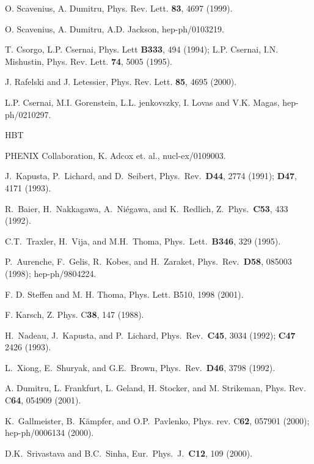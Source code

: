 \begin{thebibliography}{00}
 O. Scavenius, A. Dumitru,
         Phys. Rev. Lett. {\bf 83}, 4697 (1999).
         
 O. Scavenius, A. Dumitru, A.D. Jackson, 
          hep-ph/0103219.
          
 T. Csorgo, L.P. Csernai, Phys. Lett {\bf B333}, 494 (1994);
       L.P. Csernai, I.N. Mishustin, Phys. Rev. Lett. {\bf 74}, 5005 (1995).
       
 J. Rafelski and J. Letessier, Phys. Rev. Lett. {\bf 85},
                  4695 (2000).

 L.P. Csernai, M.I. Gorenstein, L.L. jenkovszky, 
                        I. Lovas and V.K. Magas, hep-ph/0210297.

 HBT

 PHENIX Collaboration, K. Adcox et. al., 
                    nucl-ex/0109003.

 J.\ Kapusta, P.\ Lichard, and D.\ Seibert, 
   Phys.\ Rev.\ {\bf D44}, 2774 (1991); {\bf D47}, 4171 (1993). 

 R.\ Baier, H.\ Nakkagawa, A.\ Ni\'{e}gawa, and
K.\ Redlich, Z.\ Phys.\ {\bf C53}, 433 (1992).

 C.T.\ Traxler, H.\ Vija, and M.H.\ Thoma,
Phys.\ Lett.\ {\bf B346}, 329 (1995).
  
 P.\ Aurenche, F.\ Gelis, R.\ Kobes, and H.\ Zaraket,
  Phys.\ Rev.\ {\bf D58}, 085003 (1998); \mbox{hep-ph/9804224}. 

 F. D. Steffen and M. H. Thoma, Phys. Lett. B510, 
                  1998 (2001).
                  
 F. Karsch, Z. Phys. C{\bf 38}, 147 (1988).
  
 H.\ Nadeau, J.\ Kapusta, and P.\ Lichard,
Phys.\ Rev.\ {\bf C45}, 3034 (1992); {\bf C47} 2426 (1993).

 L.\ Xiong, E.\ Shuryak, and G.E.\ Brown, Phys.\
Rev.\ {\bf D46}, 3798 (1992).

 A. Dumitru, L. Frankfurt, L. Geland, H. Stocker, and
               M. Strikeman, Phys. Rev. C{\bf 64}, 054909 (2001).

 K.\ Gallmeister, B.\ K\"ampfer, and O.P.\ Pavlenko, 
            Phys. rev. C{\bf 62}, 057901 (2000); hep-ph/0006134 (2000).

 D.K.\ Srivastava and B.C.\ Sinha,
             Eur.\ Phys.\ J.\ {\bf C12}, 109 (2000).


\end{thebibliography}
